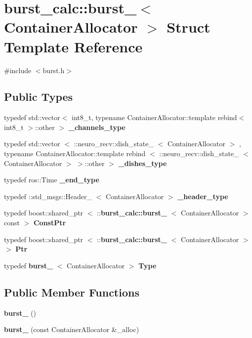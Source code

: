 \section{burst\-\_\-calc\-:\-:burst\-\_\-$<$ \-Container\-Allocator $>$ \-Struct \-Template \-Reference}
\label{structburst__calc_1_1burst__}


{\ttfamily \#include $<$burst.\-h$>$}

\subsection*{\-Public \-Types}
\begin{DoxyCompactItemize}
\item 
typedef std\-::vector$<$ int8\-\_\-t, \*
typename \*
\-Container\-Allocator\-::template \*
rebind$<$ int8\-\_\-t $>$\-::other $>$ {\bf \-\_\-channels\-\_\-type}
\item 
typedef std\-::vector\*
$<$ \-::neuro\-\_\-recv\-::dish\-\_\-state\-\_\-\*
$<$ \-Container\-Allocator $>$\*
, typename \*
\-Container\-Allocator\-::template \*
rebind\*
$<$ \-::neuro\-\_\-recv\-::dish\-\_\-state\-\_\-\*
$<$ \-Container\-Allocator $>$\*
 $>$\-::other $>$ {\bf \-\_\-dishes\-\_\-type}
\item 
typedef ros\-::\-Time {\bf \-\_\-end\-\_\-type}
\item 
typedef \-::std\-\_\-msgs\-::\-Header\-\_\-\*
$<$ \-Container\-Allocator $>$ {\bf \-\_\-header\-\_\-type}
\item 
typedef boost\-::shared\-\_\-ptr\*
$<$ \-::{\bf burst\-\_\-calc\-::burst\-\_\-}\*
$<$ \-Container\-Allocator $>$ const  $>$ {\bf \-Const\-Ptr}
\item 
typedef boost\-::shared\-\_\-ptr\*
$<$ \-::{\bf burst\-\_\-calc\-::burst\-\_\-}\*
$<$ \-Container\-Allocator $>$ $>$ {\bf \-Ptr}
\item 
typedef {\bf burst\-\_\-}\*
$<$ \-Container\-Allocator $>$ {\bf \-Type}
\end{DoxyCompactItemize}
\subsection*{\-Public \-Member \-Functions}
\begin{DoxyCompactItemize}
\item 
{\bf burst\-\_\-} ()
\item 
{\bf burst\-\_\-} (const \-Container\-Allocator \&\-\_\-alloc)
\end{DoxyCompactItemize}
